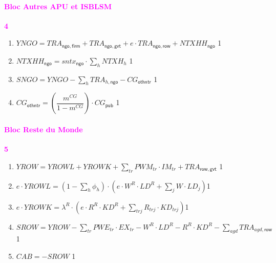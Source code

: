 \documentclass[11pt,a4paper]{article}
\newcommand{\trj}{\mathit{trj}}
\newcommand{\agd}{\mathit{agd}}
\newcommand{\gvt}{\mathsf{gvt}}
\newcommand{\firm}{\mathsf{firm}}
\newcommand{\ngo}{\mathsf{ngo}}
\newcommand{\row}{\mathsf{row}}
\newcommand{\CAB}{\mathit{CAB}}
\newcommand{\CG}{\mathit{CG}}
\newcommand{\sntx}{\mathit{sntx}}
\newcommand{\EX}{\mathit{EX}}
\newcommand{\IM}{\mathit{IM}}
\newcommand{\NTXHH}{\mathit{NTXHH}}
\newcommand{\KD}{\mathit{KD}}
\newcommand{\LD}{\mathit{LD}}
\newcommand{\othntr}{\mathsf{othntr}}
\newcommand{\SNGO}{\mathit{SNGO}}
\newcommand{\PWE}{\mathit{PWE}}
\newcommand{\PWM}{\mathit{PWM}}
\newcommand{\pub}{\mathsf{pub}}
\newcommand{\TR}{\mathit{TRA}}
\newcommand{\tr}{\mathit{tr}}
\newcommand{\NTXH}{\mathit{NTXH}}
\newcommand{\YNGO}{\mathit{YNGO}}
\newcommand{\YROW}{\mathit{YROW}}
\newcommand{\YROWK}{\mathit{YROWK}}
\newcommand{\YROWL}{\mathit{YROWL}}
\newcommand{\SROW}{\mathit{SROW}}
\newcommand{\redparagraph}[1]{\paragraph*{\large\textcolor{Fuchsia}{#1}}}
\begin{document}
	
	\redparagraph{Bloc Autres APU et ISBLSM }\hfill \textcolor{Fuchsia}{\textbf{4}}
	\begin{enumerate}[itemsep=2pt,label=\textbf{eq\arabic*}.,resume,  ref=\textbf{eq\arabic*}]
		
		\item $\YNGO = \TR_{\ngo,\firm} + \TR_{\ngo,\gvt} + e\cdot\TR_{\ngo,\row} + \NTXHH_{\ngo} $ \hfill 1
		
		\item  $\NTXHH_{\ngo} = \sntx_{\ngo} \cdot \sum_{h}\NTXH_h$ \hfill 1
		
		\item $\SNGO = \YNGO - \sum_{h}\TR_{h,\ngo}  - \CG_{\othntr}$ \hfill 1	
		
		\item $\CG_{\othntr} = \left(\dfrac{m^{\CG}}{1-m^{\CG}}\right)\cdot \CG_{\pub}$	\label{it:Gothntr}	\hfill 1		
		
	\end{enumerate}
	
	\redparagraph{Bloc Reste du Monde}\hfill \textcolor{Fuchsia}{\textbf{5}}
	\begin{enumerate}[itemsep=2pt,label=\textbf{eq\arabic*}.,resume,  ref=\textbf{eq\arabic*}]
		
		\item $\YROW =  \YROWL + \YROWK +\sum_{\tr}^{} \PWM_{\tr}\cdot\IM_{tr} + \TR_{\row,\gvt}$ \hfill 1
		
		\item $e\cdot\YROWL = \left(1 -\sum_{h}\phi_h\right)\cdot \left(e\cdot  W^R\cdot\LD^R + \sum_{j}^{} W\cdot\LD_{j}\right) $\hfill 1
		
		\item $e\cdot\YROWK = \lambda^R\cdot \left(e\cdot R^R\cdot\KD^R + \sum_{\trj}^{} R_{\trj}\cdot\KD_{\trj}\right) $\hfill 1
		
		\item $\SROW = \YROW - \sum_{\tr}^{} \PWE_{\tr}\cdot\EX_{\tr}  -  W^R\cdot\LD^R  -  R^R\cdot\KD^R  - \sum_{\agd}\TR_{\agd,\row}$\hfill 1	
		
		\item $\CAB = -\SROW$ \hfill 1
		
	\end{enumerate}
	
\end{document}
